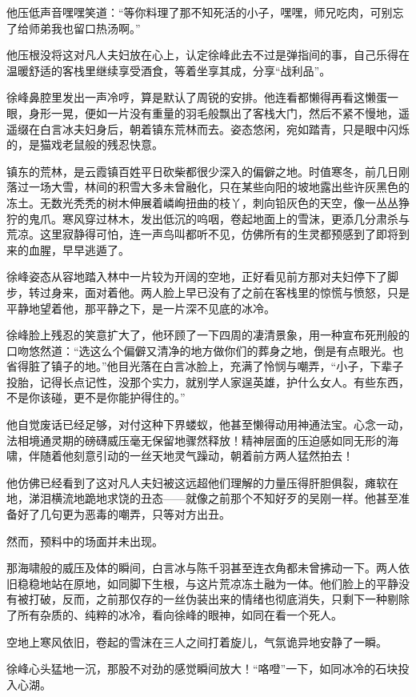 他压低声音嘿嘿笑道：“等你料理了那不知死活的小子，嘿嘿，师兄吃肉，可别忘了给师弟我也留口热汤啊。”

他压根没将这对凡人夫妇放在心上，认定徐峰此去不过是弹指间的事，自己乐得在温暖舒适的客栈里继续享受酒食，等着坐享其成，分享“战利品”。

徐峰鼻腔里发出一声冷哼，算是默认了周锐的安排。他连看都懒得再看这懒蛋一眼，身形一晃，便如一片没有重量的羽毛般飘出了客栈大门，然后不紧不慢地，遥遥缀在白言冰夫妇身后，朝着镇东荒林而去。姿态悠闲，宛如踏青，只是眼中闪烁的，是猫戏老鼠般的残忍快意。

镇东的荒林，是云霞镇百姓平日砍柴都很少深入的偏僻之地。时值寒冬，前几日刚落过一场大雪，林间的积雪大多未曾融化，只在某些向阳的坡地露出些许灰黑色的冻土。无数光秃秃的树木伸展着嶙峋扭曲的枝丫，刺向铅灰色的天空，像一丛丛狰狞的鬼爪。寒风穿过林木，发出低沉的呜咽，卷起地面上的雪沫，更添几分肃杀与荒凉。这里寂静得可怕，连一声鸟叫都听不见，仿佛所有的生灵都预感到了即将到来的血腥，早早逃遁了。

徐峰姿态从容地踏入林中一片较为开阔的空地，正好看见前方那对夫妇停下了脚步，转过身来，面对着他。两人脸上早已没有了之前在客栈里的惊慌与愤怒，只是平静地望着他，那平静之下，是一片深不见底的冰冷。

徐峰脸上残忍的笑意扩大了，他环顾了一下四周的凄清景象，用一种宣布死刑般的口吻悠然道：“选这么个偏僻又清净的地方做你们的葬身之地，倒是有点眼光。也省得脏了镇子的地。”他目光落在白言冰脸上，充满了怜悯与嘲弄，“小子，下辈子投胎，记得长点记性，没那个实力，就别学人家逞英雄，护什么女人。有些东西，不是你该碰，更不是你能护得住的。”

他自觉废话已经足够，对付这种下界蝼蚁，他甚至懒得动用神通法宝。心念一动，法相境通灵期的磅礴威压毫无保留地骤然释放！精神层面的压迫感如同无形的海啸，伴随着他刻意引动的一丝天地灵气躁动，朝着前方两人猛然拍去！

他仿佛已经看到了这对凡人夫妇被这远超他们理解的力量压得肝胆俱裂，瘫软在地，涕泪横流地跪地求饶的丑态——就像之前那个不知好歹的吴刚一样。他甚至准备好了几句更为恶毒的嘲弄，只等对方出丑。

然而，预料中的场面并未出现。

那海啸般的威压及体的瞬间，白言冰与陈千羽甚至连衣角都未曾拂动一下。两人依旧稳稳地站在原地，如同脚下生根，与这片荒凉冻土融为一体。他们脸上的平静没有被打破，反而，之前那仅存的一丝伪装出来的情绪也彻底消失，只剩下一种剔除了所有杂质的、纯粹的冰冷，看向徐峰的眼神，如同在看一个死人。

空地上寒风依旧，卷起的雪沫在三人之间打着旋儿，气氛诡异地安静了一瞬。

徐峰心头猛地一沉，那股不对劲的感觉瞬间放大！“咯噔”一下，如同冰冷的石块投入心湖。

